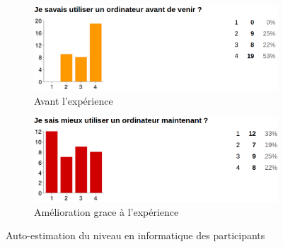 \begin{figure}
  \begin{center}
    \begin{subfigure}[b]{.49\textwidth}
      \includegraphics[width=\textwidth]{content/8-validation/images/avant}
      \caption{Avant l'expérience}
    \end{subfigure}
    \begin{subfigure}[b]{.49\textwidth}
      \includegraphics[width=\textwidth]{content/8-validation/images/apres}
      \caption{Amélioration grace à l'expérience}
    \end{subfigure}
    \caption{Auto-estimation du niveau en informatique des participants}
    \label{fig:niveau-info}
  \end{center}
\end{figure}
